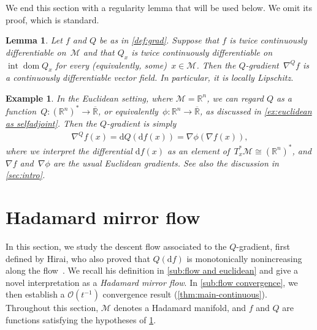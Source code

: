 \documentclass[11pt,letterpaper]{article}
\newtheorem{lemma}[theorem]{Lemma}\AddToHook{env/lemma/begin}{\crefalias{theorem}{lemma}}
\newtheorem{example}[theorem]{Example}\AddToHook{env/example/begin}{\crefalias{theorem}{example}}
\numberwithin{equation}{section}
\newcommand{\RR}{\mathbb{R}}
\newcommand{\diff}{\mathrm{d}}
\newcommand{\MM}{\mathcal{M}}
\DeclareMathOperator{\intr}{int}
\DeclareMathOperator{\dom}{dom}
\begin{document}
We end this section with a regularity lemma that will be used below.
We omit its proof, which is standard.

\begin{lemma}\label{lem:C1 Q-gradient}
Let $f$ and $Q$ be as in \cref{def:grad}.
Suppose that $f$ is twice continuously differentiable on~$\MM$ and that $Q_x$ is twice continuously differentiable on~$\intr\dom Q_x$ for every (equivalently, some)~$x \in \MM$.
Then the $Q$-gradient~$\nabla^Q f$ is a continuously differentiable vector field.
In particular, it is locally Lipschitz.
\end{lemma}

\begin{example}\label{ex:euclidean q-gradient}
In the Euclidean setting, where $\MM = \RR^n$, we can regard $Q$ as a function~$Q \colon (\RR^n)^* \to \overline{\RR}$, or equivalently~$\phi \colon \RR^n \to \overline{\RR}$, as discussed in \cref{ex:euclidean as selfadjoint}.
Then the $Q$-gradient is simply
\begin{align}\label{eq:euclidean q-gradient}
    \nabla^Q f(x) = \diff Q(\diff f(x)) = \nabla \phi(\nabla f(x)),
\end{align}
where we interpret the differential $\diff f(x)$ as an element of~$T_x^*\MM \cong (\RR^n)^*$, and $\nabla f$ and~$\nabla\phi$ are the usual Euclidean gradients.
See also the discussion in \cref{sec:intro}.
\end{example}

\section{Hadamard mirror flow}\label{sec:continuous-time}
In this section, we study the descent flow associated to the $Q$-gradient, first defined by Hirai, who also proved that $Q(\diff f)$ is monotonically nonincreasing along the flow~\cite{Hirai2025}.
We recall his definition in \cref{sub:flow and euclidean} and give a novel interpretation as a \emph{Hadamard mirror flow}.
In \cref{sub:flow convergence}, we then establish a $\mathcal{O}(t^{-1})$ convergence result (\cref{thm:main-continuous}).
Throughout this section, $\MM$ denotes a Hadamard manifold, and $f$ and $Q$ are functions satisfying the hypotheses of \cref{lem:C1 Q-gradient}.

\end{document}
